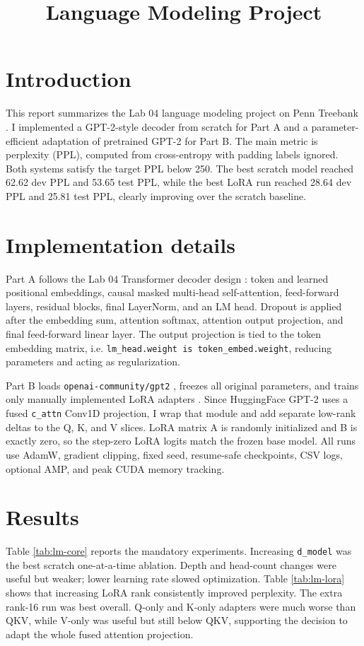 \documentclass[a4paper]{article}
\title{Language Modeling Project}
\begin{document}
\maketitle

\section{Introduction}
This report summarizes the Lab 04 language modeling project on Penn Treebank \cite{marcus1993ptb}. I implemented a GPT-2-style decoder from scratch for Part A and a parameter-efficient adaptation of pretrained GPT-2 for Part B. The main metric is perplexity (PPL), computed from cross-entropy with padding labels ignored. Both systems satisfy the target PPL below 250. The best scratch model reached 62.62 dev PPL and 53.65 test PPL, while the best LoRA run reached 28.64 dev PPL and 25.81 test PPL, clearly improving over the scratch baseline.

\section{Implementation details}
Part A follows the Lab 04 Transformer decoder design \cite{vaswani2017attention}: token and learned positional embeddings, causal masked multi-head self-attention, feed-forward layers, residual blocks, final LayerNorm, and an LM head. Dropout is applied after the embedding sum, attention softmax, attention output projection, and final feed-forward linear layer. The output projection is tied to the token embedding matrix, i.e. \texttt{lm\_head.weight is token\_embed.weight}, reducing parameters and acting as regularization.

Part B loads \texttt{openai-community/gpt2} \cite{radford2019language}, freezes all original parameters, and trains only manually implemented LoRA adapters \cite{hu2022lora}. Since HuggingFace GPT-2 uses a fused \texttt{c\_attn} Conv1D projection, I wrap that module and add separate low-rank deltas to the Q, K, and V slices. LoRA matrix A is randomly initialized and B is exactly zero, so the step-zero LoRA logits match the frozen base model. All runs use AdamW, gradient clipping, fixed seed, resume-safe checkpoints, CSV logs, optional AMP, and peak CUDA memory tracking.

\section{Results}
Table \ref{tab:lm-core} reports the mandatory experiments. Increasing \texttt{d\_model} was the best scratch one-at-a-time ablation. Depth and head-count changes were useful but weaker; lower learning rate slowed optimization. Table \ref{tab:lm-lora} shows that increasing LoRA rank consistently improved perplexity. The extra rank-16 run was best overall. Q-only and K-only adapters were much worse than QKV, while V-only was useful but still below QKV, supporting the decision to adapt the whole fused attention projection.
\end{document}
